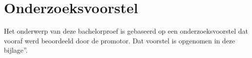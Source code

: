 \documentclass[dutch,dit,thesis]{hogentreport}
\begin{document}

\mainmatter{}







%
%




\appendix

\chapter{Onderzoeksvoorstel}

Het onderwerp van deze bachelorproef is gebaseerd op een onderzoeksvoorstel dat vooraf werd beoordeeld door de promotor. Dat voorstel is opgenomen in deze bijlage”.





%


\backmatter{}

\setlength\bibitemsep{2pt} %
\printbibliography[heading=bibintoc]
\end{document}
